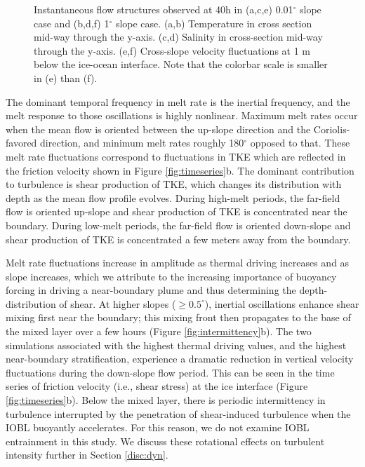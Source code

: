 \documentclass[draft]{agujournal2019}
\begin{document}
\begin{figure}[]
\begin{minipage}{0.6\textwidth}
    \end{minipage}%
    \begin{minipage}{0.05\textwidth}
    \hfill
    \end{minipage}
    \caption{Instantaneous flow structures observed at 40h in (a,c,e) 0.01$^{\circ}$ slope case and (b,d,f) 1$^{\circ}$ slope case. (a,b) Temperature in cross section mid-way through the y-axis. (c,d) Salinity in cross-section mid-way through the y-axis. (e,f) Cross-slope velocity fluctuations at 1 m below the ice-ocean interface. Note that the colorbar scale is smaller in (e) than (f).}
    \label{fig:cross-section}
\end{figure}

The dominant temporal frequency in melt rate is the inertial frequency, and the melt response to those oscillations is highly nonlinear. Maximum melt rates occur when the mean flow is oriented between the up-slope direction and the Coriolis-favored direction, and minimum melt rates roughly 180$^{\circ}$ opposed to that. These melt rate fluctuations correspond to fluctuations in TKE which are reflected in the friction velocity shown in Figure \ref{fig:timeseries}b. The dominant contribution to turbulence is shear production of TKE, which changes its distribution with depth as the mean flow profile evolves. During high-melt periods, the far-field flow is oriented up-slope and shear production of TKE is concentrated near the boundary. During low-melt periods, the far-field flow is oriented down-slope and shear production of TKE is concentrated a few meters away from the boundary. 

Melt rate fluctuations increase in amplitude as thermal driving increases and as slope increases, which we attribute to the increasing importance of buoyancy forcing in driving a near-boundary plume and thus determining the depth-distribution of shear. At higher slopes ($\geq 0.5^{\circ}$), inertial oscillations enhance shear mixing first near the boundary; this mixing front then propagates to the base of the mixed layer over a few hours (Figure \ref{fig:intermittency}b). The two simulations associated with the highest thermal driving values, and the highest near-boundary stratification, experience a dramatic reduction in vertical velocity fluctuations during the down-slope flow period. This can be seen in the time series of friction velocity (i.e., shear stress) at the ice interface (Figure \ref{fig:timeseries}b). Below the mixed layer, there is periodic intermittency in turbulence interrupted by the penetration of shear-induced turbulence when the IOBL buoyantly accelerates. For this reason, we do not examine IOBL entrainment in this study. We discuss these rotational effects on turbulent intensity further in Section \ref{disc:dyn}.
\end{document}
